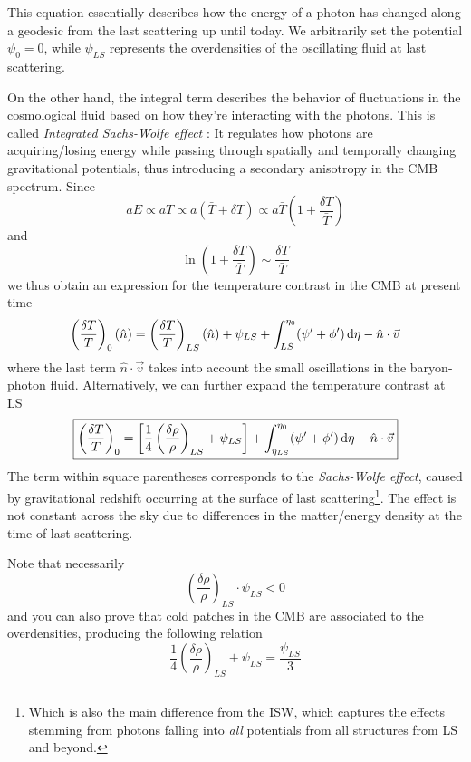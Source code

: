 This equation essentially describes how the energy of a photon has changed along a geodesic from the last scattering up until today. We arbitrarily set the potential $\psi_{0} = 0$, while $\psi_{LS}$ represents the overdensities of the oscillating fluid at last scattering.
\par On the other hand, the integral term describes the behavior of fluctuations in the cosmological fluid based on how they're interacting with the photons. This is called \emph{Integrated Sachs-Wolfe effect} \cite{1967ApJ...147...73S}: It regulates how photons are acquiring/losing energy while passing through spatially and temporally changing gravitational potentials, thus introducing a secondary anisotropy in the CMB spectrum. Since 
\begin{equation}
    aE \propto aT \propto a(\bar{T}+\delta T) \propto a\bar{T}\left(1+\frac{\delta T}{\bar{T}}\right)
\end{equation}
and 
\begin{equation}
    \ln\left(1+\frac{\delta T}{\bar{T}}\right) \sim \frac{\delta T}{\bar{T}}
\end{equation}
we thus obtain an expression for the temperature contrast in the CMB at present time 
\begin{equation}
    \left(\frac{\delta T}{T}\right)_{0}(\hat{n}) = \left(\frac{\delta T}{T}\right)_{LS}(\hat{n}) + \psi_{LS} + \int_{LS}^{\eta_{0}}(\psi'+\phi')\,\text{d}\eta - \hat{n}\cdot\vec{v}
\end{equation}
where the last term $\hat{n}\cdot\vec{v}$ takes into account the small oscillations in the baryon-photon fluid. Alternatively, we can further expand the temperature contrast at LS 
\begin{equation}
    \boxed{
     \left(\frac{\delta T}{T}\right)_{0} = \left[\frac{1}{4}\left(\frac{\delta\rho}{\rho}\right)_{LS}+\psi_{LS}\right] + \int_{\eta_{LS}}^{\eta_{0}}(\psi'+\phi')\,\text{d}\eta - \hat{n}\cdot\vec{v}
    }
    \label{eq:temperaturecontrast-sw}
\end{equation}
The term within square parentheses corresponds to the \emph{Sachs-Wolfe effect}, caused by gravitational redshift occurring at the surface of last scattering\footnote{Which is also the main difference from the ISW, which captures the effects stemming from photons falling into \emph{all} potentials from all structures from LS and beyond.}. The effect is not constant across the sky due to differences in the matter/energy density at the time of last scattering. 
\begin{tcolorbox}[enhanced,attach boxed title to top center={yshift=-3mm,yshifttext=-1mm},
  colback=blue!5!white,colframe=blue!75!black,colbacktitle=blue!80!black,
  title=Sachs-Wolfe Effect,
  boxed title style={size=small,colframe=blue!50!black}]
  Note that necessarily $$ \left(\frac{\delta\rho}{\rho}\right)_{LS}\cdot \psi_{LS} < 0$$ and you can also prove that cold patches in the CMB are associated to the overdensities, producing the following relation $$ \frac{1}{4}\left(\frac{\delta\rho}{\rho}\right)_{LS}+\psi_{LS} = \frac{\psi_{LS}}{3}$$
\end{tcolorbox}

